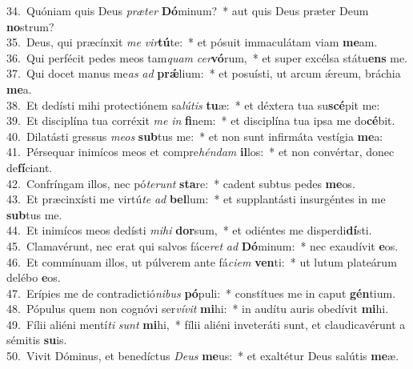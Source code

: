 {34.~}Quóniam quis Deus \textit{præ}\textit{ter} \textbf{Dó}minum?~* aut quis Deus præter Deum \textbf{no}strum?\\
{35.~}Deus, qui præcínxit \textit{me} \textit{vir}\textbf{tú}te:~* et pósuit immaculátam viam \textbf{me}am.\\
{36.~}Qui perfécit pedes meos tam\textit{quam} \textit{cer}\textbf{vó}rum,~* et super excélsa státu\textbf{ens} me.\\
{37.~}Qui docet manus me\textit{as} \textit{ad} \textbf{prǽ}lium:~* et posuísti, ut arcum ǽreum, bráchia \textbf{me}a.\\
{38.~}Et dedísti mihi protectiónem sa\textit{lú}\textit{tis} \textbf{tu}æ:~* et déxtera tua su\textbf{scé}pit me:\\
{39.~}Et disciplína tua corréxit \textit{me} \textit{in} \textbf{fi}nem:~* et disciplína tua ipsa me do\textbf{cé}bit.\\
{40.~}Dilatásti gressus \textit{me}\textit{os} \textbf{sub}tus me:~* et non sunt infirmáta vestígia \textbf{me}a:\\
{41.~}Pérsequar inimícos meos et compre\textit{hén}\textit{dam} \textbf{il}los:~* et non convértar, donec de\textbf{fí}ciant.\\
{42.~}Confríngam illos, nec pó\textit{te}\textit{runt} \textbf{sta}re:~* cadent subtus pedes \textbf{me}os.\\
{43.~}Et præcinxísti me virtú\textit{te} \textit{ad} \textbf{bel}lum:~* et supplantásti insurgéntes in me \textbf{sub}tus me.\\
{44.~}Et inimícos meos dedísti \textit{mi}\textit{hi} \textbf{dor}sum,~* et odiéntes me disperdi\textbf{dí}sti.\\
{45.~}Clamavérunt, nec erat qui salvos fáce\textit{ret} \textit{ad} \textbf{Dó}minum:~* nec exaudívit \textbf{e}os.\\
{46.~}Et commínuam illos, ut púlverem ante fá\textit{ci}\textit{em} \textbf{ven}ti:~* ut lutum plateárum delébo \textbf{e}os.\\
{47.~}Erípies me de contradictió\textit{ni}\textit{bus} \textbf{pó}puli:~* constítues me in caput \textbf{gén}tium.\\
{48.~}Pópulus quem non cognóvi ser\textit{ví}\textit{vit} \textbf{mi}hi:~* in audítu auris obedívit \textbf{mi}hi.\\
{49.~}Fílii aliéni mentí\textit{ti} \textit{sunt} \textbf{mi}hi,~* fílii aliéni inveteráti sunt, et claudicavérunt a sémitis \textbf{su}is.\\
{50.~}Vivit Dóminus, et benedíctus \textit{De}\textit{us} \textbf{me}us:~* et exaltétur Deus salútis \textbf{me}æ.\\
